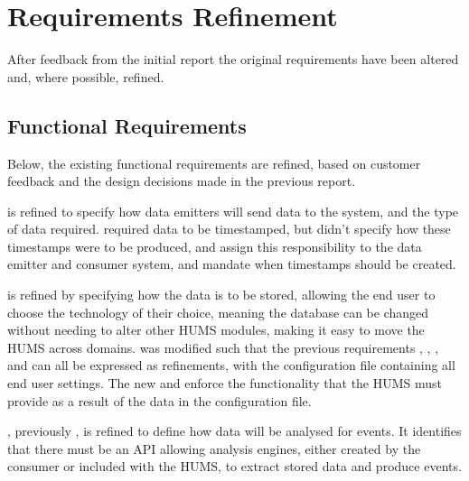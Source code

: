 \section{Requirements Refinement}
\label{sec:requirements}
After feedback from the initial report the original requirements have been 
altered and, where possible, refined.

\subsection{Functional Requirements}
\label{sec:requirements-functional}
Below, the existing functional requirements are refined, based on customer 
feedback and the design decisions made in the previous report.

 is refined to specify how data emitters will send data to the system, 
and the type of data required. 
 required data to be timestamped, but didn't specify how these 
timestamps were to be produced,  and  assign this
responsibility to the data emitter and consumer system, and mandate when 
timestamps should be created.

 is refined by specifying how the data is to be stored, allowing the end 
user to choose the technology of their choice, meaning the database can be 
changed without needing to alter other HUMS modules, making it easy to 
move the HUMS across domains.
 was modified such that the previous requirements , , 
, and  can all be expressed as refinements, with the 
configuration file containing all end user settings. The new  and  
enforce the  functionality that the HUMS must provide as a result of the data 
in the configuration file.

, previously , is refined to define how data will be analysed for 
events. It identifies that there must be an API allowing analysis engines, 
either created by the consumer or included with the HUMS, to extract stored 
data and produce events. 

